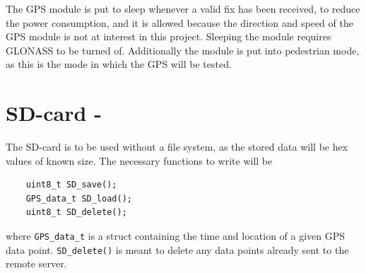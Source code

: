 The GPS module is put to sleep whenever a valid fix has been received, to reduce the power consumption, and it is allowed because the direction and speed of the GPS module is not at interest in this project.
Sleeping the module requires GLONASS to be turned of.
Additionally the module is put into pedestrian mode, as this is the mode in which the GPS will be tested.

\section{SD-card - \SDsock}
The SD-card is to be used without a file system, as the stored data will be hex values of known size.
The necessary functions to write will be
\begin{verbatim}
	uint8_t SD_save();
	GPS_data_t SD_load();
	uint8_t SD_delete();
\end{verbatim}
where \texttt{GPS_data_t} is a struct containing the time and location of a given GPS data point.
\texttt{SD_delete()} is meant to delete any data points already sent to the remote server.

\FloatBarrier